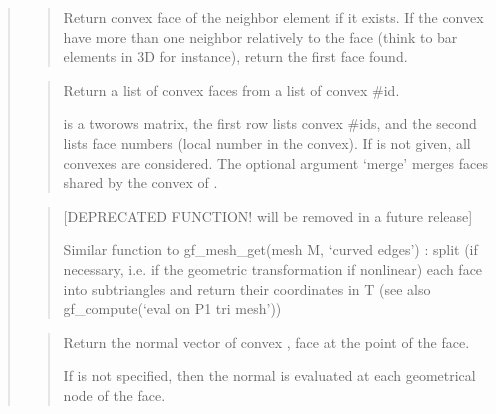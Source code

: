 \documentclass[a4paper,11pt,english]{sphinxmanual}
\begin{document}
\begin{quote}
\begin{quote}

Return convex face of the neighbor element if it exists.
If the convex have more than one neighbor
relatively to the face  (think to bar elements in 3D for instance),
return the first face found.
\end{quote}

\begin{quote}

Return a list of convex faces from a list of convex \#id.

 is a two\sphinxhyphen{}rows matrix, the first row lists convex \#ids,
and the second lists face numbers (local number in the convex).
If  is not given, all convexes are considered. The optional
argument ‘merge’ merges faces shared by the convex of .
\end{quote}

\begin{quote}

{[}DEPRECATED FUNCTION! will be removed in a future release{]}

Similar function to gf\_mesh\_get(mesh M, ‘curved edges’) : split (if
necessary, i.e. if the geometric transformation if non\sphinxhyphen{}linear)
each face into sub\sphinxhyphen{}triangles and return their coordinates in T
(see also gf\_compute(‘eval on P1 tri mesh’))
\end{quote}

\begin{quote}

Return the normal vector of convex , face  at the  point of the face.

If  is not specified, then the normal is evaluated at each
geometrical node of the face.
\end{quote}


\end{quote}
\end{document}
